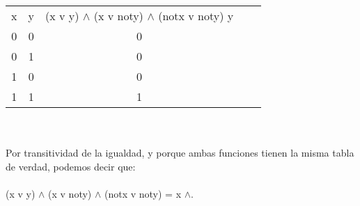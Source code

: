 \documentclass[a4paper,10pt]{article}
\begin{document}
\begin{tabular}{ c c c c c}
x & y & (x v y) $\wedge$ (x v noty) $\wedge$ (notx v noty)  y \\ 
 0 & 0 & 0 \\  
 0 & 1 & 0 \\
 1 & 0 & 0 \\
 1 & 1 & 1  
\end{tabular}\\\\
Por transitividad de la igualdad, y porque ambas funciones tienen la misma tabla de verdad, podemos decir que:\\\\
(x v y) $\wedge$ (x v noty) $\wedge$ (notx v noty) = x $\wedge$.
\end{document}
